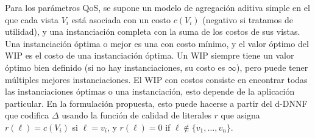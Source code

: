 Para los parámetros QoS, se supone un modelo de agregación aditiva simple en el
que cada vista
$V_i$ está asociada con un costo $c(V_i)$ (negativo si tratamos de utilidad),
y una instanciación completa con la suma de los costos de sus vistas.
Una instanciación óptima o mejor es una con costo mínimo, y el valor óptimo del
WIP es el costo de una instanciación óptima.
Un WIP siempre tiene un valor óptimo bien definido (si no hay instanciaciones,
su costo es $\infty$), pero puede tener múltiples mejores instanciaciones.
El WIP con costos consiste en encontrar todas las instanciaciones óptimas o una
instanciación, esto depende de la aplicación particular.
En la formulación propuesta, esto puede hacerse a partir del d-DNNF que codifica
$\Delta$
usando la función de calidad de literales $r$ que asigna
$r(\ell)=c(V_i)$ si
$\ell=v_i$, y $r(\ell)=0$ if $\ell\notin\{v_1,\ldots,v_n\}$.
